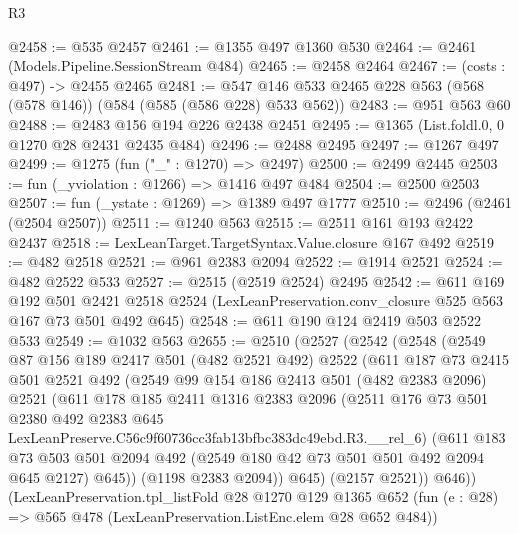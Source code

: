\begin{lexlean}{R3}
\begin{coremodule}
@2458 := @535 @2457
@2461 := @1355 @497 @1360 @530
@2464 := @2461 (Models.Pipeline.SessionStream @484)
@2465 := @2458 @2464
@2467 := (costs : @497) -> @2455 @2465
@2481 := @547 @146 @533 @2465 @228 @563 (@568 (@578 @146)) (@584 (@585 (@586 @228) @533 @562))
@2483 := @951 @563 @60
@2488 := @2483 @156 @194 @226 @2438 @2451
@2495 := @1365 (List.foldl.{0, 0} @1270 @28 @2431 @2435 @484)
@2496 := @2488 @2495
@2497 := @1267 @497
@2499 := @1275 (fun ("_" : @1270) => @2497)
@2500 := @2499 @2445
@2503 := fun (_yviolation : @1266) => @1416 @497 @484
@2504 := @2500 @2503
@2507 := fun (_ystate : @1269) => @1389 @497 @1777
@2510 := @2496 (@2461 (@2504 @2507))
@2511 := @1240 @563
@2515 := @2511 @161 @193 @2422 @2437
@2518 := LexLeanTarget.TargetSyntax.Value.closure @167 @492
@2519 := @482 @2518
@2521 := @961 @2383 @2094
@2522 := @1914 @2521
@2524 := @482 @2522 @533
@2527 := @2515 (@2519 @2524) @2495
@2542 := @611
    @169
    @192
    @501
    @2421
    @2518
    @2524
    (LexLeanPreservation.conv_closure @525 @563 @167 @73 @501 @492 @645)
@2548 := @611 @190 @124 @2419 @503 @2522 @533
@2549 := @1032 @563
@2655 := @2510
    (@2527
      (@2542
        (@2548
          (@2549
            @87
            @156
            @189
            @2417
            @501
            (@482 @2521 @492)
            @2522
            (@611
              @187
              @73
              @2415
              @501
              @2521
              @492
              (@2549
                @99
                @154
                @186
                @2413
                @501
                (@482 @2383 @2096)
                @2521
                (@611
                  @178
                  @185
                  @2411
                  @1316
                  @2383
                  @2096
                  (@2511
                    @176
                    @73
                    @501
                    @2380
                    @492
                    @2383
                    @645
                    LexLeanPreserve.C56c9f60736cc3fab13bfbc383dc49ebd.R3.__rel_6)
                  (@611
                    @183
                    @73
                    @503
                    @501
                    @2094
                    @492
                    (@2549 @180 @42 @73 @501 @501 @492 @2094 @645 @2127)
                    @645))
                (@1198 @2383 @2094))
              @645)
            (@2157 @2521))
          @646))
      (LexLeanPreservation.tpl_listFold
        @28
        @1270
        @129
        @1365
        @652
        (fun (e : @28) => @565 @478 (LexLeanPreservation.ListEnc.elem @28 @652 @484))

\end{coremodule}
\end{lexlean}
